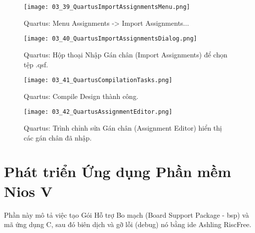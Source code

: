 \begin{figure}[htbp] \centering \texttt{[image: 03\_39\_QuartusImportAssignmentsMenu.png]} \caption{Quartus: Menu Assignments -> Import Assignments...} \label{fig:03_39} \end{figure}
\begin{figure}[htbp] \centering \texttt{[image: 03\_40\_QuartusImportAssignmentsDialog.png]} \caption{Quartus: Hộp thoại Nhập Gán chân (Import Assignments) để chọn tệp .qsf.} \label{fig:03_40} \end{figure}
\begin{figure}[htbp] \centering \texttt{[image: 03\_41\_QuartusCompilationTasks.png]} \caption{Quartus: Compile Design thành công.} \label{fig:03_41} \end{figure}
\begin{figure}[htbp] \centering \texttt{[image: 03\_42\_QuartusAssignmentEditor.png]} \caption{Quartus: Trình chỉnh sửa Gán chân (Assignment Editor) hiển thị các gán chân đã nhập.} \label{fig:03_42} \end{figure}

\FloatBarrier

\section{Phát triển Ứng dụng Phần mềm Nios V}
\label{sec:develop_software}

Phần này mô tả việc tạo Gói Hỗ trợ Bo mạch (Board Support Package - \acrshort{bsp}) và mã ứng dụng C, sau đó biên dịch và gỡ lỗi (debug) nó bằng \acrshort{ide} Ashling RiscFree.

